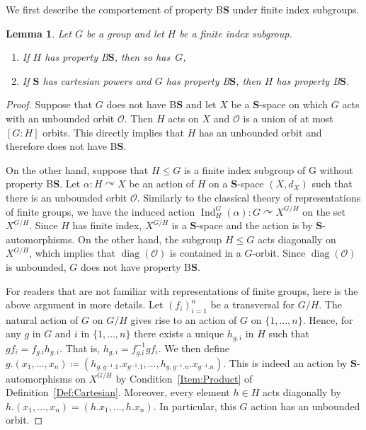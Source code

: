 \documentclass[a4paper]{article}
\newtheorem{lem}{Lemma}[section]
\theoremstyle{definition}
\DeclareMathOperator\Ind{Ind}
\DeclareMathOperator\diag{diag}
\newcommand*{\orbite}{\mathcal O}
\newcommand*{\BS}{B$\mathbf{S}$}
\begin{document}
We first describe the comportement of property \BS{} under finite index subgroups.
%
%
\begin{lem}\label{Lemma:Subgroup}
Let $G$ be a group and let $H$ be a finite index subgroup.
\begin{enumerate}
\item
If $H$ has property \BS, then so has~$G$,
\item
If $\mathbf{S}$ has cartesian powers and $G$ has property \BS, then $H$ has property \BS.
\end{enumerate}
\end{lem}
\begin{proof}
Suppose that $G$ does not have \BS{} and let $X$ be a $\mathbf S$-space on which $G$ acts with an unbounded orbit $\orbite$.
Then $H$ acts on $X$ and $\orbite$ is a union of at most $[G:H]$ orbits. This directly implies that $H$ has an unbounded orbit and therefore does not have \BS.

On the other hand, suppose that $H\leq G$ is a finite index subgroup of G without property \BS.
Let $\alpha\colon H\curvearrowright X$ be an action of $H$ on a $\mathbf S$-space $(X,d_X)$ such that there is an unbounded orbit $\orbite$.
Similarly to the classical theory of representations of finite groups, we have the induced  action $\Ind_H^G(\alpha)\colon G \curvearrowright X^{G/H}$ on the set $X^{G/H}$. Since $H$ has finite index, $X^{G/H}$ is a $\mathbf S$-space and the action is by $\mathbf{S}$-automorphisms. On the other hand, the subgroup $H\leq G$ acts diagonally on $X^{G/H}$, which implies that $\diag(\orbite)$ is contained in a $G$-orbit.
Since $\diag(\orbite)$ is unbounded, $G$ does not have property \BS.

For readers that are not familiar with representations of finite groups, here is the above argument in more details.
Let $(f_i)_{i=1}^n$ be a transversal for $G/H$.
The natural action of $G$ on $G/H$ gives rise to an action of $G$ on $\{1,\dots,n\}$.
Hence, for any $g$ in $G$ and $i$ in $\{1,\dots,n\}$ there exists a unique $h_{g,i}$ in $H$ such that $gf_i=f_{g.i}h_{g,i}$. That is, $h_{g,i}=f_{g.i}^{-1}gf_i$.
We then define $g.(x_1,\dots,x_n)\coloneqq(h_{g,g^{-1}.1}.x_{g^{-1}.1},\dots,h_{g,g^{-1}.n}.x_{g^{-1}.n})$. This is indeed an action by $\mathbf{S}$-auto\-mor\-phisms on $X^{G/H}$ by Condition~\ref{Item:Product} of Definition~\ref{Def:Cartesian}.
Moreover, every element $h\in H$ acts diagonally by $h.(x_1,\dots,x_n)=(h.x_1,\dots,h.x_n)$.
In particular, this $G$ action has an unbounded orbit.
\end{proof}
\end{document}
